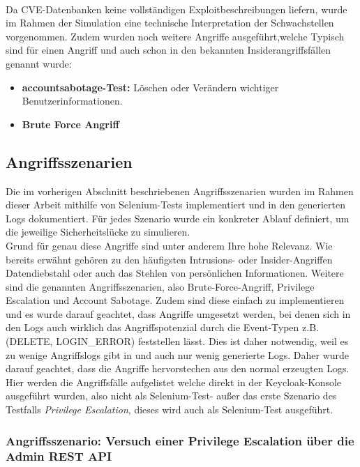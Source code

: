 \documentclass[a4paper,12pt]{article}
\begin{document}
	\\[0.5em]
	Da CVE-Datenbanken keine vollständigen Exploitbeschreibungen liefern, wurde im Rahmen der Simulation eine technische Interpretation der Schwachstellen vorgenommen. Zudem wurden noch weitere Angriffe ausgeführt,welche Typisch sind für einen Angriff und auch schon in den bekannten Insiderangriffsfällen genannt wurde:
	\begin{itemize}
		\item \textbf{\gls{accountsabotage}-Test: }  
		Löschen oder Verändern wichtiger Benutzerinformationen.
		\item \textbf{Brute Force Angriff}
	\end{itemize}

	\subsection{Angriffsszenarien}                         
	Die im vorherigen Abschnitt beschriebenen Angriffsszenarien wurden im Rahmen dieser Arbeit mithilfe von Selenium-Tests implementiert und in den generierten Logs dokumentiert. Für jedes Szenario wurde ein konkreter Ablauf definiert, um die jeweilige Sicherheitslücke zu simulieren.
	\\[0.5em]
	Grund für genau diese Angriffe sind unter anderem Ihre hohe Relevanz. Wie bereits erwähnt gehören zu den häufigsten Intrusions- oder Insider-Angriffen Datendiebstahl oder auch das Stehlen von persönlichen Informationen. Weitere sind die genannten Angriffsszenarien, also Brute-Force-Angriff, Privilege Escalation und Account Sabotage. Zudem sind diese einfach zu implementieren und es wurde darauf geachtet, dass Angriffe umgesetzt werden, bei denen sich in den Logs auch wirklich das Angriffspotenzial durch die Event-Typen z.B. (DELETE, LOGIN\_ERROR) feststellen lässt. Dies ist daher notwendig, weil es zu wenige Angriffslogs gibt in und auch nur wenig generierte Logs. Daher wurde darauf geachtet, dass die Angriffe hervorstechen aus den normal erzeugten Logs.
	\\[0.5em]
	Hier werden die Angriffsfälle aufgelistet welche direkt in der Keycloak-Konsole ausgeführt wurden, also nicht als Selenium-Test- außer das erste Szenario des Testfalls \textit{Privilege Escalation}, dieses wird auch als Selenium-Test ausgeführt.
	
	\subsubsection{Angriffsszenario: Versuch einer Privilege Escalation über die Admin REST API}
	
\end{document}
